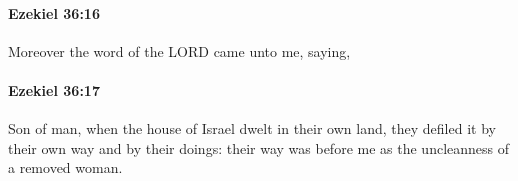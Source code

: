 		\paragraph{Ezekiel 36:16} %
			\label{EZEKIEL-36-16}

			Moreover the word of the LORD came unto me, saying,


		\paragraph{Ezekiel 36:17} %
			\label{EZEKIEL-36-17}

			Son of man, when the house of Israel dwelt in their own land, they defiled it by their own way and by their doings: their way was before me as the uncleanness of a removed woman.


